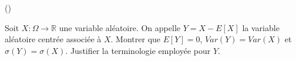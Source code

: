 \begin{exercice}\label{exo4-5} (\boringexo)

Soit $X : \Omega \rightarrow \mathbb{R}$ une variable al\'eatoire. 
On appelle $Y = X - E[X]$ la variable al\'eatoire centr\'ee
associ\'ee \`a $X$. Montrer que $E[Y] = 0$, $Var(Y) = Var(X)$ et $\sigma (Y) = \sigma (X)$. 
Justifier la terminologie employ\'ee pour $Y$.

\medskip


\end{exercice}
